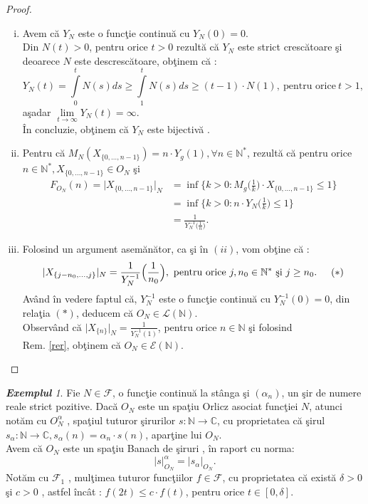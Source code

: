 \documentclass[ a4paper, 12pt]{report}
\theoremstyle{definition}
\theoremstyle{remark}
\newtheorem{exemple}{\bf Exemplul}[section]
\numberwithin{equation}{section}
\begin{document}
\begin{proof}
\begin{enumerate}[(i)]
\item Avem c\u a $Y_N$ este o func\c tie continu\u a cu $Y_N(0) = 0$.\\
Din $N(t) > 0$, pentru orice $t >0$ rezult\u a c\u a $Y_N$ este strict cresc\u atoare \c si deoarece $N$ este descresc\u atoare, ob\c tinem c\u a :
\[Y_N(t)  = \int\limits_{0}^{t} N(s) ds \geq \int\limits_{1}^{t} N(s) ds \geq (t-1) \cdot N(1),\ \mbox{pentru orice}\  t > 1,\]
 a\c sadar $\lim\limits_{t \rightarrow \infty} Y_N(t) = \infty.$\\
\^In concluzie, ob\c tinem c\u a $Y_N$ este bijectiv\u a .
\item Pentru c\u a $M_N(X_{\{0, \ldots, n-1\}}) = n \cdot Y_g(1), \forall n \in \mathbb{N}^{\ast}$, rezult\u a c\u a pentru orice $n \in \mathbb{N}^{\ast}, X_{\{0, \ldots, n-1\}} \in O_N$ \c si 
\begin{align*}
F_{O_{N}}(n) = \lvert X_{\{0,\ldots, n-1\}}\rvert_{N} &= \inf\Big\{k >0 : M_g\Big(\frac{1}{k}\Big) \cdot X_{\{0, \ldots, n-1\}}\leq 1 \Big\}\\
 &= \inf \Big\{ k>0 : n \cdot Y_N\Big(\frac{1}{k}\Big) \leq 1 \Big\}\\
  &= \frac{1}{Y_N^{-1}\Big(\frac{1}{n}\Big)}.
\end{align*}  
\item Folosind un argument asem\u an\u ator, ca \c si \^in $(ii)$, vom ob\c tine c\u a :
\[ \lvert X_{\{ j-n_0, \ldots , j \}} \rvert_{N} =\frac{1}{Y_N^{-1}}\Big(\frac{1}{n_0}\Big),\ \mbox{pentru orice}\  j,n_0 \in \mathbb{N}^{\ast}\ \mbox{\c si}\ j \geq n_0. \hspace{5mm} (\ast)\]  
Av\^and \^in vedere faptul c\u a, $Y_N^{-1}$ este o func\c tie continu\u a cu $Y_N^{-1}(0) = 0$, din rela\c tia $(\ast)$, deducem c\u a $O_N \in \mathcal{L}(\mathbb{N}).$\\
Observ\^and c\u a $\lvert X_{\{ n \}} \rvert_{N} = \frac{1}{Y_N^{-1}(1)}$, pentru orice $n \in \mathbb{N}$ \c si folosind \\Rem. \ref{rer}, ob\c tinem c\u a $O_N \in \mathcal{E}(\mathbb{N}).$\\
\end{enumerate}
\end{proof}
\begin{exemple}
Fie $N \in \mathcal{F}$, o func\c tie continu\u a la st\^anga \c si $(\alpha_n)$, un \c sir de numere reale strict pozitive. Dac\u a $O_N$ este un spa\c tiu Orlicz asociat func\c tiei $N$, atunci not\u am cu $O_N^{\alpha}$ , spa\c tiul tuturor \c sirurilor $s : \mathbb{N} \rightarrow \mathbb{C}$, cu proprietatea c\u a \c sirul $s_{\alpha} : \mathbb{N} \rightarrow \mathbb{C}, s_{\alpha}(n) = \alpha_n \cdot s(n)$, apar\c tine lui $O_N.$\\
Avem c\u a $O_N$ este un spa\c tiu Banach de \c siruri , \^in raport cu norma: 
\[\lvert s \rvert_{O_{N}}^{\alpha} = \lvert s_{\alpha}\rvert_{O_{N}}.\]
Not\u am cu $\mathcal{F}_{1}$ , mul\c timea tuturor func\c tiilor $f \in \mathcal{F}$, cu proprietatea c\u a exist\u a $\delta > 0$ \c si $c>0$ , astfel \^inc\^at : $f(2t) \leq c \cdot f(t)$, pentru orice $t \in [0,\delta].$
\end{exemple}
\end{document}
